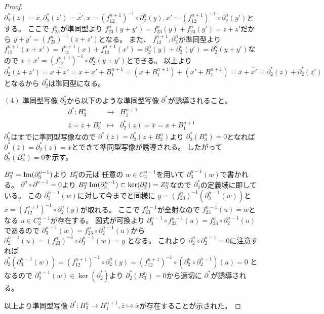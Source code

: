 \documentclass[dvipdfmx]{jsarticle}
\begin{document}
\begin{proof}
  $\partial^*_2(z) = \overline{x} , \partial^*_2(z') = \overline{x'} , x = (f_{12}^{n+1})^{-1} \circ \partial^n_2(y) , x' = (f_{12}^{n+1})^{-1} \circ \partial^n_2(y')$とする。
  ここで $f_{23}^n$が準同型より
  $f_{23}^n(y + y') = f_{23}^n(y) + f_{23}^n(y') = z + z'$だから
  $y + y' = (f_{23}^n)^{-1}(z + z')$となる。
  また、 $f_{12}^{n+1} , \partial^n_2$が準同型より
  $f_{12}^{n+1}(x + x') = f_{12}^{n+1}(x) + f_{12}^{n+1}(x') = \partial^n_2(y) + \partial^n_2(y') = \partial^n_2(y + y')$なので
  $x + x' = (f_{12}^{n+1})^{-1} \circ \partial^n_2(y + y')$とできる。
  以上より $\partial^*_2(z + z') = \overline{x + x'} = x + x' + B^{n+1}_1 = (x + B^{n+1}_1) + (x' + B^{n+1}_1) = \overline{x} + \overline{x'} = \partial^*_2(z) + \partial^*_2(z')$となるから $\partial^*_2$は準同型になる。

  $(4)$
  準同型写像 $\partial^*_2$から以下のような準同型写像 $\partial^*$が誘導されること。
  \begin{eqnarray*}
    \partial^* : H^n_3 & \longrightarrow & H^{n+1}_1 \\
    \overline{z} = z + B^n_3 & \longmapsto & \partial^*_2(z) = \overline{x} = x + B^{n+1}_1
  \end{eqnarray*}
  $\partial^*_2$はすでに準同型写像なので $\partial^*(\overline{z}) = \partial^*_2(z + B^n_3)$より $\partial^*_2(B^n_3) = 0$となれば
  $\partial^*(\overline{z}) = \partial^*_2(z) = \overline{x}$とできて準同型写像が誘導される。
  したがって $\partial^*_2(B^n_3) = 0$を示す。

  $B^n_3 = \mathop{\mathrm{Im}}\nolimits(\partial^{n-1}_3)$より $B^n_3$の元は
  任意の $w \in C^{n-1}_3$を用いて $\partial^{n-1}_3(w)$で書かれる。
  $\partial^n \circ \partial^{n-1} = 0$より $B^n_3 \mathop{\mathrm{Im}}\nolimits(\partial^{n-1}_3) \subset \ker(\partial^n_3) = Z^n_3$なので $\partial^*_2$の定義域に即している。
  この $\partial^{n-1}_3(w)$に対して今までと同様に
  $y = (f_{23}^n)^{-1}(\partial^{n-1}_3(w))$と
  $x = (f_{12}^{n+1})^{-1} \circ \partial^n_2(y)$が取れる。
  ここで $f_{23}^{n-1}$が全射なので $f_{23}^{n-1}(u) = w$となる $u \in C^{n-1}_2$が存在する。
  図式が可換より $\partial^{n-1}_3 \circ f_{23}^{n-1}(u) = f_{23}^n \circ \partial^{n-1}_2(u)$であるので
  $\partial^{n-1}_3(w) = f_{23}^n \circ \partial^{n-1}_2(u)$から
  $\partial^{n-1}_2(u) = (f_{23}^n)^{-1} \circ \partial^{n-1}_3(w) = y$
  となる。
  これより $\partial^n_2 \circ \partial^{n-1}_2 = 0$に注意すれば
  $\partial^*_2(\partial^{n-1}_3(w)) = (f_{12}^{n+1})^{-1} \circ \partial^n_2(y) = (f_{12}^{n+1})^{-1} \circ (\partial^n_2 \circ \partial^{n-1}_2)(u) = 0$
  となるので $\partial^{n-1}_3(w) \in \ker(\partial^*_2)$より
  $\partial^*_2(B^n_3) = 0$から適切に $\partial^*$が誘導される。

  以上より準同型写像 $\partial^* : H^n_3 \longrightarrow H^{n+1}_1 , \overline{z} \longmapsto \overline{x}$が存在することが示された。
\end{proof}
\end{document}
